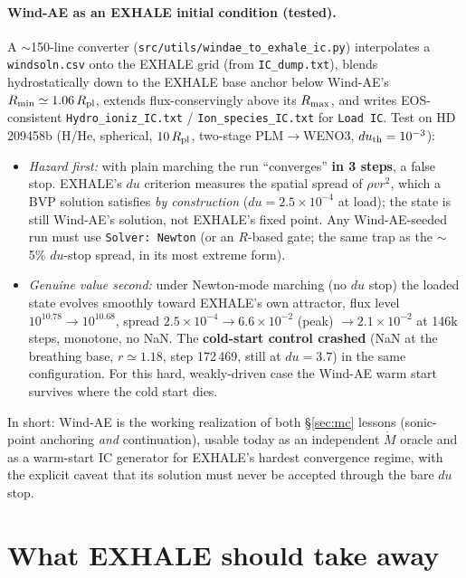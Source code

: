 \documentclass[english,a4paper]{my_memo}
\begin{document}
\paragraph{Wind-AE as an EXHALE initial condition (tested).} A
$\sim$150-line converter (\texttt{src/utils/windae\_to\_exhale\_ic.py})
interpolates a \texttt{windsoln.csv} onto the EXHALE grid
(from \texttt{IC\_dump.txt}), blends hydrostatically down to the EXHALE
base anchor below Wind-AE's $R_{\rm min}\simeq1.06\,R_{\rm pl}$, extends
flux-conservingly above its $R_{\rm max}$, and writes EOS-consistent
\texttt{Hydro\_ioniz\_IC.txt} / \texttt{Ion\_species\_IC.txt} for
\texttt{Load IC}. Test on HD\,209458b (H/He, spherical, $10\,R_{\rm
pl}$, two-stage PLM$\to$WENO3, $du_{\rm th}=10^{-3}$):
\begin{itemize}
\item \emph{Hazard first:} with plain marching the run ``converges''
  \textbf{in 3 steps}, a false stop. EXHALE's $du$ criterion measures
  the spatial spread of $\rho v r^2$, which a BVP solution satisfies
  \emph{by construction} ($du=2.5\times10^{-4}$ at load); the state is
  still Wind-AE's solution, not EXHALE's fixed point. Any Wind-AE-seeded
  run must use \texttt{Solver: Newton} (or an $R$-based gate; the same
  trap as the $\sim$5\% $du$-stop spread, in its most extreme form).
\item \emph{Genuine value second:} under Newton-mode marching (no $du$
  stop) the loaded state evolves smoothly toward EXHALE's own attractor,
  flux level $10^{10.78}\to10^{10.68}$, spread
  $2.5\times10^{-4}\to6.6\times10^{-2}$ (peak) $\to2.1\times10^{-2}$ at
  146k steps, monotone, no NaN. The \textbf{cold-start control crashed}
  (NaN at the breathing base, $r\simeq1.18$, step 172\,469, still at
  $du=3.7$) in the same configuration. For this hard, weakly-driven case
  the Wind-AE warm start survives where the cold start dies.
\end{itemize}
In short: Wind-AE is the working realization of both \S\ref{sec:mc}
lessons (sonic-point anchoring \emph{and} continuation), usable today as
an independent $\dot M$ oracle and as a warm-start IC generator for
EXHALE's hardest convergence regime, with the explicit caveat that
its solution must never be accepted through the bare $du$ stop.

\section{What EXHALE should take away}
\end{document}
